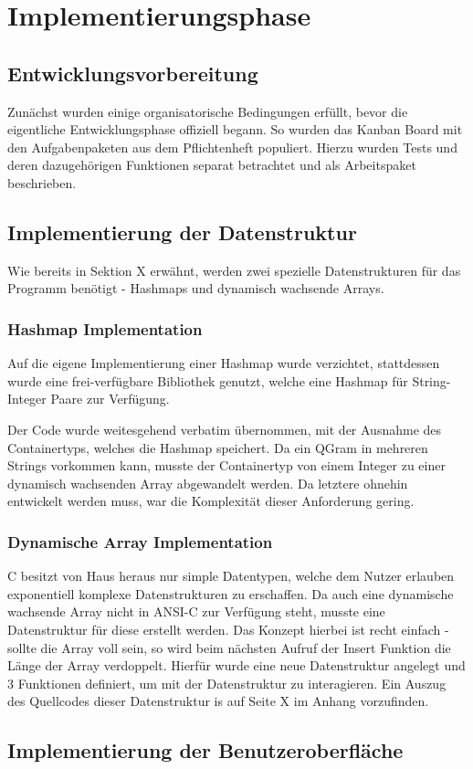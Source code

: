 \section{Implementierungsphase}

\subsection{Entwicklungsvorbereitung}
Zunächst wurden einige organisatorische Bedingungen erfüllt, bevor die eigentliche
Entwicklungsphase offiziell begann. So wurden das Kanban Board mit den
Aufgabenpaketen aus dem Pflichtenheft populiert. Hierzu wurden Tests und deren
dazugehörigen Funktionen separat betrachtet und als Arbeitspaket beschrieben.

\subsection{Implementierung der Datenstruktur}
Wie bereits in Sektion X erwähnt, werden zwei spezielle Datenstrukturen für das
Programm benötigt - Hashmaps und dynamisch wachsende Arrays.

\subsubsection{Hashmap Implementation}


Auf die eigene Implementierung einer Hashmap wurde verzichtet, stattdessen wurde
eine frei-verfügbare Bibliothek genutzt, welche eine Hashmap für
String-Integer Paare zur Verfügung.

Der Code wurde weitesgehend verbatim übernommen, mit der Ausnahme des
Containertyps, welches die Hashmap speichert. Da ein QGram in mehreren Strings
vorkommen kann, musste der Containertyp von einem Integer zu einer dynamisch
wachsenden Array abgewandelt werden. Da letztere ohnehin entwickelt werden muss,
war die Komplexität dieser Anforderung gering.

\subsubsection{Dynamische Array Implementation}
C besitzt von Haus heraus nur simple Datentypen, welche dem Nutzer erlauben
exponentiell komplexe Datenstrukturen zu erschaffen. Da auch eine dynamische wachsende
Array nicht in ANSI-C zur Verfügung steht, musste eine Datenstruktur für diese erstellt werden.
Das Konzept hierbei ist recht einfach - sollte die Array voll sein, so wird beim
nächsten Aufruf der Insert Funktion die Länge der Array verdoppelt. Hierfür wurde eine
neue Datenstruktur angelegt und 3 Funktionen definiert, um mit der Datenstruktur
zu interagieren. Ein Auszug des Quellcodes dieser Datenstruktur is auf Seite X
im Anhang vorzufinden.\par

\subsection{Implementierung der Benutzeroberfläche}

\clearpage